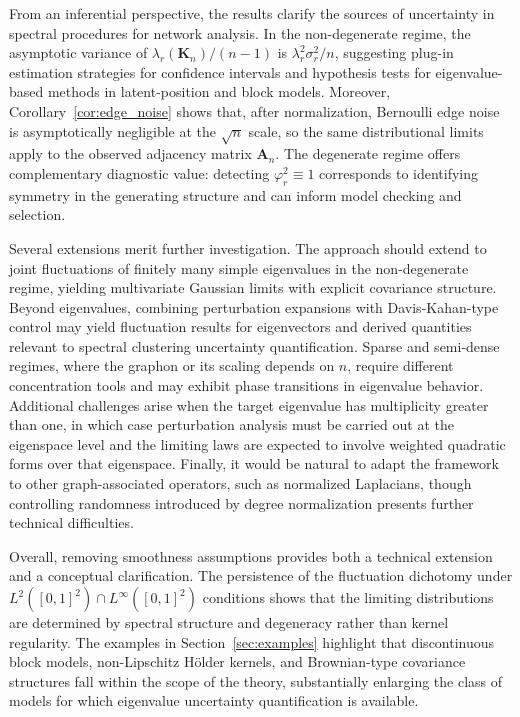 \documentclass[11pt]{article}
\theoremstyle{plain}
\theoremstyle{remark}
\begin{document}
From an inferential perspective, the results clarify the sources of uncertainty in spectral procedures for network analysis. In the non-degenerate regime, the asymptotic variance of $\lambda_r(\mathbf K_n)/(n-1)$ is $\lambda_r^2\sigma_r^2/n$, suggesting plug-in estimation strategies for confidence intervals and hypothesis tests for eigenvalue-based methods in latent-position and block models. Moreover, Corollary~\ref{cor:edge_noise} shows that, after normalization, Bernoulli edge noise is asymptotically negligible at the $\sqrt{n}$ scale, so the same distributional limits apply to the observed adjacency matrix $\mathbf A_n$. The degenerate regime offers complementary diagnostic value: detecting $\varphi_r^2\equiv 1$ corresponds to identifying symmetry in the generating structure and can inform model checking and selection.

Several extensions merit further investigation. The approach should extend to joint fluctuations of finitely many simple eigenvalues in the non-degenerate regime, yielding multivariate Gaussian limits with explicit covariance structure. Beyond eigenvalues, combining perturbation expansions with Davis-Kahan-type control may yield fluctuation results for eigenvectors and derived quantities relevant to spectral clustering uncertainty quantification. Sparse and semi-dense regimes, where the graphon or its scaling depends on $n$, require different concentration tools and may exhibit phase transitions in eigenvalue behavior. Additional challenges arise when the target eigenvalue has multiplicity greater than one, in which case perturbation analysis must be carried out at the eigenspace level and the limiting laws are expected to involve weighted quadratic forms over that eigenspace. Finally, it would be natural to adapt the framework to other graph-associated operators, such as normalized Laplacians, though controlling randomness introduced by degree normalization presents further technical difficulties.

Overall, removing smoothness assumptions provides both a technical extension and a conceptual clarification. The persistence of the fluctuation dichotomy under $L^2([0,1]^2) \cap L^\infty ([0,1]^2)$ conditions shows that the limiting distributions are determined by spectral structure and degeneracy rather than kernel regularity. The examples in Section~\ref{sec:examples} highlight that discontinuous block models, non-Lipschitz H\"older kernels, and Brownian-type covariance structures fall within the scope of the theory, substantially enlarging the class of models for which eigenvalue uncertainty quantification is available.
\end{document}
